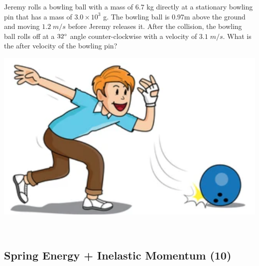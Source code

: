 \documentclass{article}
\begin{document}
\begin{minipage}{0.6\textwidth}
    Jeremy rolls a bowling ball with a mass of $6.7$ kg directly at a stationary
    bowling pin that has a mass of $3.0\times 10^{3}$ g. The bowling ball is 0.97m above the ground and moving
    $1.2\;m/s$ before Jeremy releases it. After the collision, the bowling ball rolls off at a $32\degree$ angle
    counter-clockwise with a velocity of $3.1\;m/s$. What is the after velocity of the bowling pin?
\end{minipage}
\hspace{5pt}
\begin{minipage}{0.3\textwidth}
    \includegraphics[scale=0.5]{images/bowling.png}
\end{minipage}\leavevmode\\

\subsection{Spring Energy + Inelastic Momentum (10)}

\vspace{5pt}
\end{document}
